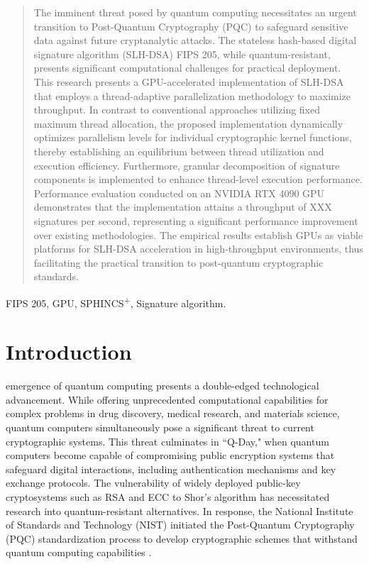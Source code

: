 \documentclass[journal]{IEEEtran}
\begin{document}
\begin{abstract}
The imminent threat posed by quantum computing necessitates an urgent transition to Post-Quantum Cryptography (PQC) to safeguard sensitive data against future cryptanalytic attacks.
The stateless hash-based digital signature algorithm (SLH-DSA) FIPS 205, while quantum-resistant, presents significant computational challenges for practical deployment.
This research presents a GPU-accelerated implementation of SLH-DSA that employs a thread-adaptive parallelization methodology to maximize throughput.
In contrast to conventional approaches utilizing fixed maximum thread allocation, the proposed implementation dynamically optimizes parallelism levels for individual cryptographic kernel functions, thereby establishing an equilibrium between thread utilization and execution efficiency.
Furthermore, granular decomposition of signature components is implemented to enhance thread-level execution performance.
Performance evaluation conducted on an NVIDIA RTX 4090 GPU demonstrates that the implementation attains a throughput of XXX signatures per second, representing a significant performance improvement over existing methodologies.
The empirical results establish GPUs as viable platforms for SLH-DSA acceleration in high-throughput environments, thus facilitating the practical transition to post-quantum cryptographic standards.
\end{abstract}

\begin{IEEEkeywords}
  FIPS 205, GPU, SPHINCS\textsuperscript{+}, Signature algorithm.
\end{IEEEkeywords}

\section{Introduction}
\label{sec:intro}


 emergence of quantum computing presents a double-edged technological advancement. While offering unprecedented computational capabilities for complex problems in drug discovery, medical research, and materials science, quantum computers simultaneously pose a significant threat to current cryptographic systems. This threat culminates in ``Q-Day," when quantum computers become capable of compromising public encryption systems that safeguard digital interactions, including authentication mechanisms and key exchange protocols. The vulnerability of widely deployed public-key cryptosystems such as RSA and ECC to Shor's algorithm \cite{Shor1994} has necessitated research into quantum-resistant alternatives. In response, the National Institute of Standards and Technology (NIST) initiated the Post-Quantum Cryptography (PQC) standardization process to develop cryptographic schemes that withstand quantum computing capabilities \cite{NIST2016}.
\end{document}
